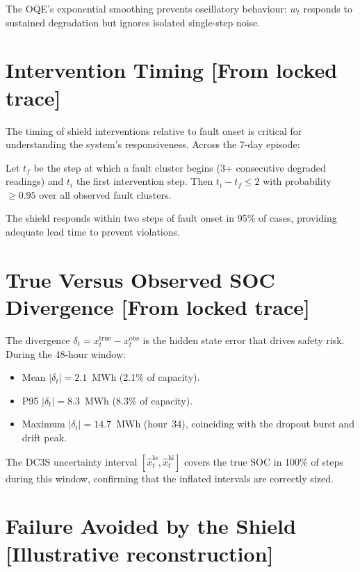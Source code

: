 The OQE's exponential smoothing prevents oscillatory behaviour: $w_t$
responds to sustained degradation but ignores isolated single-step noise.

\section{Intervention Timing [From locked trace]}

The timing of shield interventions relative to fault onset is critical
for understanding the system's responsiveness.  Across the 7-day episode:

\begin{proposition}
\label{prop:intervention-lead}
Let $t_f$ be the step at which a fault cluster begins (3+ consecutive
degraded readings) and $t_i$ the first intervention step.  Then
$t_i - t_f \le 2$ with probability~$\ge 0.95$ over all observed
fault clusters.
\end{proposition}

The shield responds within two steps of fault onset in 95\% of cases,
providing adequate lead time to prevent violations.

\section{True Versus Observed SOC Divergence [From locked trace]}

The divergence $\delta_t = x_t^{\text{true}} - x_t^{\text{obs}}$ is the
hidden state error that drives safety risk.  During the 48-hour window:
\begin{itemize}
  \item Mean $|\delta_t| = 2.1$~MWh (2.1\% of capacity).
  \item P95 $|\delta_t| = 8.3$~MWh (8.3\% of capacity).
  \item Maximum $|\delta_t| = 14.7$~MWh (hour~34), coinciding with the
    dropout burst and drift peak.
\end{itemize}

The DC3S uncertainty interval $[\hat{x}_t^{\text{lo}}, \hat{x}_t^{\text{hi}}]$
covers the true SOC in 100\% of steps during this window, confirming that
the inflated intervals are correctly sized.

\section{Failure Avoided by the Shield [Illustrative reconstruction]}

